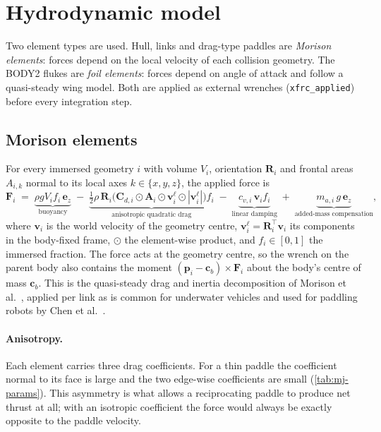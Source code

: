 \section{Hydrodynamic model}
\label{sec:mj-hydro}

Two element types are used. Hull, links and drag-type paddles are \emph{Morison
elements}: forces depend on the local velocity of each collision geometry. The BODY2
flukes are \emph{foil elements}: forces depend on angle of attack and follow a
quasi-steady wing model. Both are applied as external wrenches
(\texttt{xfrc\_applied}) before every integration step.

\subsection{Morison elements}
\label{sec:mj-morison}

For every immersed geometry $i$ with volume $V_i$, orientation $\bm R_i$ and
frontal areas $A_{i,k}$ normal to its local axes $k\in\{x,y,z\}$, the applied force is
\begin{equation}
  \bm F_i \;=\; \underbrace{\rho g V_i f_i\,\bm e_z}_{\text{buoyancy}}
  \;-\;\underbrace{\tfrac12\rho\,\bm R_i\big(\bm C_{d,i}\odot\bm A_i\odot\bm v^{\ell}_i\odot|\bm v^{\ell}_i|\big)f_i}_{\text{anisotropic quadratic drag}}
  \;-\;\underbrace{c_{v,i}\,\bm v_i f_i}_{\text{linear damping}}
  \;+\;\underbrace{m_{a,i}\,g\,\bm e_z}_{\text{added-mass compensation}},
  \label{eq:mj-morison}
\end{equation}
where $\bm v_i$ is the world velocity of the geometry centre, $\bm v^{\ell}_i=\bm R_i^{\top}\bm v_i$
its components in the body-fixed frame, $\odot$ the element-wise product, and
$f_i\in[0,1]$ the immersed fraction. The force acts at the geometry centre, so the
wrench on the parent body also contains the moment
$(\bm p_i-\bm c_b)\times\bm F_i$ about the body's centre of mass $\bm c_b$. This is the
quasi-steady drag and inertia decomposition of Morison et al.\ \cite{Morison1950},
applied per link as is common for underwater vehicles \cite{Fossen1994} and used for
paddling robots by Chen et al.\ \cite{Chen2021,Chen2023}.

\paragraph{Anisotropy.}
Each element carries three drag coefficients. For a thin paddle the coefficient
normal to its face is large and the two edge-wise coefficients are small
(\cref{tab:mj-params}). This asymmetry is what allows a reciprocating paddle to produce
net thrust at all; with an isotropic coefficient the force would always be exactly
opposite to the paddle velocity.

